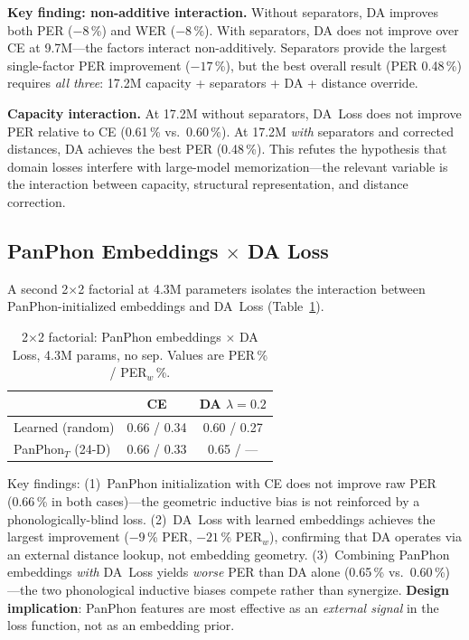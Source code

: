 \documentclass[conference]{IEEEtran}
\newcommand{\lam}{\lambda}                %
\begin{document}
\textbf{Key finding: non-additive interaction.}
Without separators, DA improves both PER ($-8$\,\%) and WER
($-8$\,\%).
With separators, DA does not improve over CE at 9.7M---the
factors interact non-additively.
Separators provide the largest single-factor PER improvement
($-17$\,\%), but the best overall result (PER 0.48\,\%) requires
\emph{all three}: 17.2M capacity + separators + DA + distance
override.

\textbf{Capacity interaction.}
At 17.2M without separators, DA~Loss does not improve PER relative
to CE (0.61\,\% vs.\ 0.60\,\%).
At 17.2M \emph{with} separators and corrected distances, DA achieves
the best PER (0.48\,\%).
This refutes the hypothesis that domain losses interfere with
large-model memorization---the relevant variable is the interaction
between capacity, structural representation, and distance correction.

\subsection{PanPhon Embeddings $\times$ DA Loss}

A second 2$\times$2 factorial at 4.3M parameters isolates the
interaction between PanPhon-initialized embeddings and DA~Loss
(Table~\ref{tab:panphon_factorial}).

\begin{table}[ht]
  \caption{2$\times$2 factorial: PanPhon embeddings $\times$ DA Loss,
           4.3M params, no sep. Values are PER\,\% / PER$_w$\,\%.}
  \label{tab:panphon_factorial}
  \centering\small
  \begin{tabular}{lcc}
    \toprule
    & CE & DA $\lam\!=\!0.2$ \\
    \midrule
    Learned (random)     & 0.66 / 0.34 & 0.60 / 0.27 \\
    PanPhon$_T$ (24-D)   & 0.66 / 0.33 & 0.65 / --- \\
    \bottomrule
  \end{tabular}
\end{table}

Key findings:
(1)~PanPhon initialization with CE does not improve raw PER
(0.66\,\% in both cases)---the geometric inductive bias is not
reinforced by a phonologically-blind loss.
(2)~DA~Loss with learned embeddings achieves the largest improvement
($-9$\,\% PER, $-21$\,\% PER$_w$), confirming that DA operates via
an external distance lookup, not embedding geometry.
(3)~Combining PanPhon embeddings \emph{with} DA~Loss yields
\emph{worse} PER than DA alone (0.65\,\% vs.\ 0.60\,\%)---the two
phonological inductive biases compete rather than synergize.
\textbf{Design implication}: PanPhon features are most effective as
an \emph{external signal} in the loss function, not as an embedding
prior.
\end{document}
